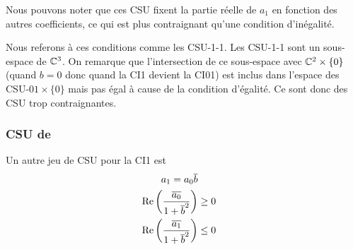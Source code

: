       Nous pouvons noter que ces CSU fixent la partie réelle de \(a_1\) en fonction des autres coefficients, ce qui est plus contraignant qu'une condition d'inégalité.
  
      Nous referons à ces conditions comme les CSU-1-1. Les CSU-1-1 sont un sous-espace de \(\mathbb C^3\). On remarque que l'intersection de ce sous-espace avec \(\mathbb C^2 \times \lbrace0\rbrace\) (quand \(b=0\) donc quand la CI1 devient la CI01) est inclus dans l'espace des \(\text{CSU-01}\times\lbrace0\rbrace\) mais pas égal à cause de la condition d'égalité. Ce sont donc des CSU trop contraignantes.
    
    \subsubsection{CSU de \cite{stupfel_implementation_2015}}

      \begin{prop}
        Un autre jeu de CSU pour la CI1 est
        \begin{align}
          a_1 = a_0 {\overline{b}} \\
          \operatorname{Re}\left(\dfrac{{\overline{a_0}}}{1 + {\overline{b}}^2}\right) &\ge 0 \\
          \operatorname{Re}\left(\dfrac{{\overline{a_1}}}{1 + {\overline{b}}^2}\right) &\le 0
        \end{align}
      \end{prop}

